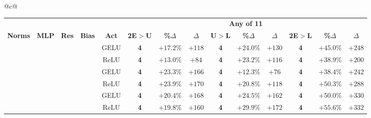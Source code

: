 \begin{tabular}{@{}c@{}}
\begin{tabular}{@{}ccccc|ccccccccc@{}}
\toprule
 &  &  &  &  & \multicolumn{9}{|c}{\textbf{Any of 11}} \\
\cmidrule(lr){6-14}
\textbf{Norms} & \textbf{MLP} & \textbf{Res} & \textbf{Bias} & \textbf{Act} & \textbf{2E$>$U} & \textbf{\%$\Delta$} & \textbf{$\Delta$} & \textbf{U$>$L} & \textbf{\%$\Delta$} & \textbf{$\Delta$} & \textbf{2E$>$L} & \textbf{\%$\Delta$} & \textbf{$\Delta$} \\
\midrule
\xmark & \cmark & \xmark & \xmark & GELU & \textbf{4} & \textcolor{green!55!black}{$+17.2\%$} & \textcolor{green!55!black}{$+118$} & \textbf{4} & \textcolor{green!55!black}{$+24.0\%$} & \textcolor{green!55!black}{$+130$} & \textbf{4} & \textcolor{green!55!black}{$+45.0\%$} & \textcolor{green!55!black}{$+248$} \\
\xmark & \cmark & \xmark & \xmark & ReLU & \textbf{4} & \textcolor{green!55!black}{$+13.0\%$} & \textcolor{green!55!black}{$+84$} & \textbf{4} & \textcolor{green!55!black}{$+23.2\%$} & \textcolor{green!55!black}{$+116$} & \textbf{4} & \textcolor{green!55!black}{$+38.9\%$} & \textcolor{green!55!black}{$+200$} \\
\hdashline[1pt/3pt]
\xmark & \cmark & \xmark & \cmark & GELU & \textbf{4} & \textcolor{green!55!black}{$+23.3\%$} & \textcolor{green!55!black}{$+166$} & \textbf{4} & \textcolor{green!55!black}{$+12.3\%$} & \textcolor{green!55!black}{$+76$} & \textbf{4} & \textcolor{green!55!black}{$+38.4\%$} & \textcolor{green!55!black}{$+242$} \\
\xmark & \cmark & \xmark & \cmark & ReLU & \textbf{4} & \textcolor{green!55!black}{$+23.9\%$} & \textcolor{green!55!black}{$+170$} & \textbf{4} & \textcolor{green!55!black}{$+20.8\%$} & \textcolor{green!55!black}{$+118$} & \textbf{4} & \textcolor{green!55!black}{$+50.3\%$} & \textcolor{green!55!black}{$+288$} \\
\hdashline[1pt/3pt]
\xmark & \cmark & \cmark & \xmark & GELU & \textbf{4} & \textcolor{green!55!black}{$+20.4\%$} & \textcolor{green!55!black}{$+168$} & \textbf{4} & \textcolor{green!55!black}{$+24.5\%$} & \textcolor{green!55!black}{$+162$} & \textbf{4} & \textcolor{green!55!black}{$+50.0\%$} & \textcolor{green!55!black}{$+330$} \\
\xmark & \cmark & \cmark & \xmark & ReLU & \textbf{4} & \textcolor{green!55!black}{$+19.8\%$} & \textcolor{green!55!black}{$+160$} & \textbf{4} & \textcolor{green!55!black}{$+29.9\%$} & \textcolor{green!55!black}{$+172$} & \textbf{4} & \textcolor{green!55!black}{$+55.6\%$} & \textcolor{green!55!black}{$+332$} \\

\end{tabular}
\end{tabular}
